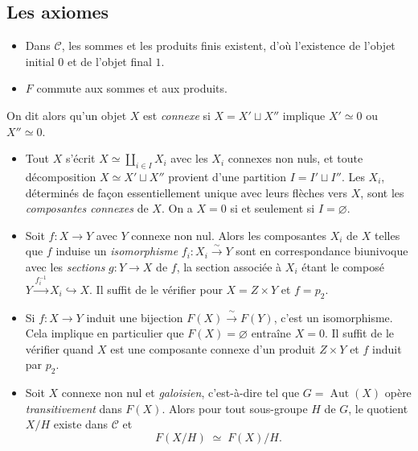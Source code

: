 \documentclass[11pt,a4paper]{article}
\begin{document}
\subsection*{Les axiomes}

\begin{itemize}
  \item[\textbf{Gal 1}] Dans $\mathcal{C}$, les sommes et les produits finis
    existent, d'où l'existence de l'objet initial $0$ et de l'objet final
    $1$.

  \item[\textbf{Gal 4}] $F$ commute aux sommes et aux produits.
\end{itemize}

On dit alors qu'un objet $X$ est \emph{connexe} si $X = X' \sqcup X''$ implique
$X' \simeq 0$ ou $X'' \simeq 0$.

\begin{itemize}
  \item[\textbf{Gal 2}] Tout $X$ s'écrit $X \simeq \coprod_{i \in I} X_{i}$
    avec les $X_{i}$ connexes non nuls, et toute décomposition
    $X \simeq X' \sqcup X''$ provient d'une partition $I = I' \sqcup I''$. Les
    $X_{i}$, déterminés de façon essentiellement unique avec leurs flèches vers
    $X$, sont les \emph{composantes connexes} de $X$. On a $X = 0$ si et
    seulement si $I = \varnothing$.

  \item[\textbf{Gal 3}] Soit $f : X \to Y$ avec $Y$ connexe non nul. Alors les
    composantes $X_{i}$ de $X$ telles que $f$ induise un \emph{isomorphisme}
    $f_{i} : X_{i} \xrightarrow{\ \sim\ } Y$ sont en correspondance
    biunivoque avec les \emph{sections} $g : Y \to X$ de $f$, la section
    associée à $X_{i}$ étant le composé
    $Y \xrightarrow{f_{i}^{-1}} X_{i} \hookrightarrow X$. Il suffit de le
    vérifier pour $X = Z \times Y$ et $f = p_{2}$.

  \item[\textbf{Gal 5}] Si $f : X \to Y$ induit une bijection
    $F(X) \xrightarrow{\ \sim\ } F(Y)$, c'est un isomorphisme. Cela implique en
    particulier que $F(X) = \varnothing$ entraîne $X = 0$. Il suffit de le
    vérifier quand $X$ est une composante connexe d'un produit $Z \times Y$ et
    $f$ induit par $p_{2}$.

  \item[\textbf{Gal 6}] Soit $X$ connexe non nul et \emph{galoisien},
    c'est-à-dire tel que $G = \operatorname{Aut}(X)$ opère
    \emph{transitivement} dans $F(X)$. Alors pour tout sous-groupe $H$ de $G$,
    le quotient $X/H$ existe dans $\mathcal{C}$ et
    \[
      F(X/H) \;\simeq\; F(X)/H .
    \]
\end{itemize}
\end{document}
